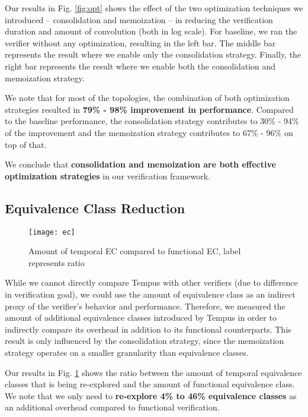 Our results in Fig. \ref{fig:opt} shows the effect of the two optimization techniques we introduced -- 
consolidation and memoization -- in reducing the verification duration and amount of convolution (both in log scale).
For baseline, we ran the verifier without any optimization, resulting in the left bar.
The middle bar represents the result where we enable only the consolidation strategy.
Finally, the right bar represents the result where we enable both the consolidation and memoization strategy.

We note that for most of the topologies, the combination of both optimization strategies resulted in 
\textbf{79\% - 98\% improvement in performance}.
Compared to the baseline performance, the consolidation strategy contributes to 30\% - 94\% of the improvement and
the memoization strategy contributes to 67\% - 96\% on top of that. 

We conclude that \textbf{consolidation and memoization are both effective optimization strategies} in our verification
framework.

\subsection{Equivalence Class Reduction}

\begin{figure}[h]
    \centering
    \texttt{[image: ec]}
    \caption{Amount of temporal EC compared to functional EC, label represents ratio}
    \label{fig:ec}
\end{figure}

While we cannot directly compare Tempus with other verifiers (due to difference in verification goal), 
we could use the amount of equivalence class as an indirect proxy of the verifier's behavior and performance.
Therefore, we measured the amount of additional equivalence classes introduced by Tempus in order to 
indirectly compare its overhead in addition to its functional counterparts.
This result is only influenced by the consolidation strategy, since the memoization strategy operates on 
a smaller granularity than equivalence classes.

Our results in Fig. \ref{fig:ec} shows the ratio between the amount of temporal equivalence classes that is 
being re-explored and the amount of functional equivalence class.
We note that we only need to \textbf{re-explore 4\% to 46\% equivalence classes} as an additional overhead 
compared to functional verification.

